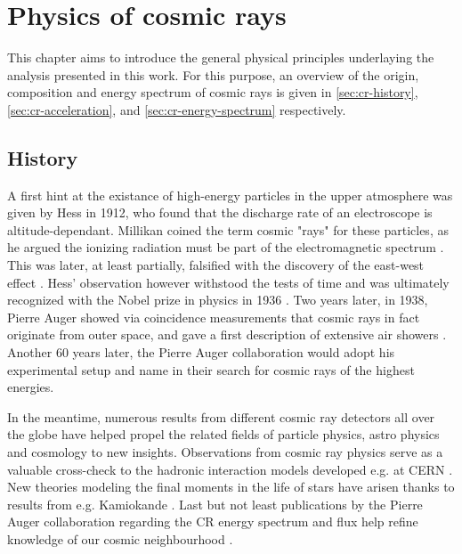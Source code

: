 
\chapter{Physics of cosmic rays}
\label{chap:physical-background}

This chapter aims to introduce the general physical principles underlaying the analysis presented in this work. For this purpose, an overview of the origin, 
composition and energy spectrum of cosmic rays is given in \autoref{sec:cr-history}, \autoref{sec:cr-acceleration}, and \autoref{sec:cr-energy-spectrum} 
respectively.

\section{History}
\label{sec:cr-history}

A first hint at the existance of high-energy particles in the upper atmosphere was given by Hess in 1912, who found that the discharge rate of an electroscope is 
altitude-dependant. Millikan coined the term cosmic "rays" for these particles, as he argued the ionizing radiation must be part of the electromagnetic spectrum 
\cite{millikan1928origin}. This was later, at least partially, falsified with the discovery of the east-west effect \cite{johnson1938note}. Hess' observation 
however withstood the tests of time and was ultimately recognized with the Nobel prize in physics in 1936 \cite{nobelprize1936}. Two years later, in 1938, Pierre 
Auger showed via coincidence measurements that cosmic rays in fact originate from outer space, and gave a first description of extensive air showers 
\cite{auger1939extensive}. Another 60 years later, the Pierre Auger collaboration would adopt his experimental setup and name in their search for cosmic rays of 
the highest energies.

In the meantime, numerous results from different cosmic ray detectors all over the globe have helped propel the related fields of particle physics, astro physics 
and cosmology to new insights. Observations from cosmic ray physics serve as a valuable cross-check to the hadronic interaction models developed e.g. at CERN 
\cite{ostapchenko2007status}. New theories modeling the final moments in the life of stars have arisen thanks to results from e.g. Kamiokande 
\cite{goldman1988implications}. Last but not least publications by the Pierre Auger collaboration regarding the CR energy spectrum and flux help refine knowledge of 
our cosmic neighbourhood \cite{abraham2010measurement, aab2015searches}.

